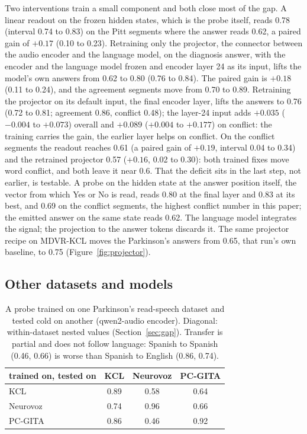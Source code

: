 \documentclass{article}
\begin{document}
Two interventions train a small component and both close most of the gap. A linear readout on the
frozen hidden states, which is the probe itself, reads 0.78 (interval 0.74 to 0.83) on the Pitt
segments where the answer reads 0.62, a paired gain of $+0.17$ (0.10 to 0.23). Retraining only the
projector, the connector between the audio encoder and the language model, on the diagnosis
answer, with the encoder and the language model frozen and encoder layer 24 as its input, lifts the
model's own answers from 0.62 to 0.80 (0.76 to 0.84). The paired gain is $+0.18$ (0.11 to 0.24), and
the agreement segments move from 0.70 to 0.89. Retraining the projector on its default input, the final
encoder layer, lifts the answers to 0.76 (0.72 to 0.81; agreement 0.86, conflict 0.48); the layer-24
input adds $+0.035$ ($-0.004$ to $+0.073$) overall and $+0.089$ ($+0.004$ to $+0.177$) on conflict:
the training carries the gain, the earlier layer helps on conflict. On the conflict segments the
readout reaches 0.61 (a
paired gain of $+0.19$, interval 0.04 to 0.34) and the retrained projector 0.57 ($+0.16$, 0.02 to
0.30): both trained fixes move word conflict, and both leave it near 0.6. That the deficit sits in the last step, not earlier, is testable. A probe on the hidden
state at the answer position itself, the vector from which Yes or No is read, reads 0.80 at the final
layer and 0.83 at its best, and 0.69 on the conflict segments, the highest conflict number in this
paper; the emitted answer on the same state reads 0.62. The language model integrates the signal; the
projection to the answer tokens discards it. The same projector recipe on MDVR-KCL moves the Parkinson's answers from 0.65, that run's own
baseline, to 0.75 (Figure~\ref{fig:projector}).

\subsection{Other datasets and models}

\begin{table}[t]
\centering\small
\caption{A probe trained on one Parkinson's read-speech dataset and tested cold on another
(qwen2-audio encoder). Diagonal: within-dataset nested values (Section~\ref{sec:gap}). Transfer is
partial and does not follow language: Spanish to Spanish (0.46, 0.66) is worse than Spanish to
English (0.86, 0.74).}
\label{tab:cross}
\begin{tabular}{@{}lccc@{}}
\toprule
trained on, tested on & KCL & Neurovoz & PC-GITA \\
\midrule
KCL       & 0.89 & 0.58 & 0.64 \\
Neurovoz  & 0.74 & 0.96 & 0.66 \\
PC-GITA   & 0.86 & 0.46 & 0.92 \\
\bottomrule
\end{tabular}
\end{table}
\end{document}
